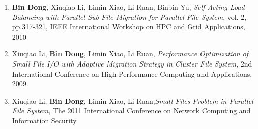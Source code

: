 \documentclass[letterpaper,11pt]{article}
\begin{document}
\begin{enumerate}[1)]
\item  \textbf{Bin Dong}, Xiuqiao Li, Limin Xiao, Li Ruan, Binbin Yu, {\it Self-Acting Load Balancing with Parallel Sub File Migration for Parallel File System}, vol. 2, pp.317-321, IEEE International Workshop on HPC and Grid Applications, 2010
\item Xiuqiao Li, \textbf{Bin Dong}, Limin Xiao, Li Ruan, {\it Performance Optimization of Small File I/O with Adaptive Migration Strategy in Cluster File System}, 2nd International Conference on High Performance Computing and Applications, 2009. 
\item Xiuqiao Li, \textbf{Bin Dong}, Limin Xiao, Li Ruan,{\it Small Files Problem in Parallel File System}, The 2011 International Conference on Network Computing and Information Security
\end{enumerate}
\end{document}
